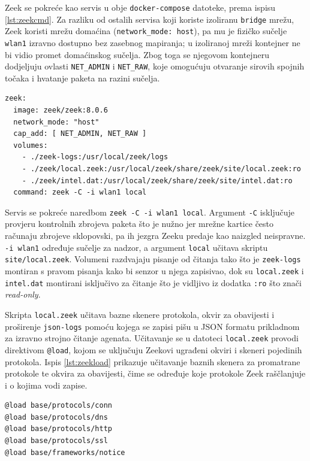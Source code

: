 Zeek se pokreće kao servis u obje \texttt{docker-compose} datoteke, prema ispisu \ref{lst:zeekcmd}. Za razliku od ostalih servisa koji koriste izoliranu
\texttt{bridge} mrežu, Zeek koristi mrežu domaćina (\texttt{network\_mode: host}), pa mu je fizičko sučelje \texttt{wlan1} izravno dostupno bez zasebnog mapiranja; u izoliranoj mreži kontejner
ne bi vidio promet domaćinskog sučelja. Zbog toga se njegovom kontejneru dodjeljuju ovlasti \texttt{NET\_ADMIN} i \texttt{NET\_RAW}, koje omogućuju otvaranje sirovih spojnih
točaka  i hvatanje paketa na razini sučelja.

\begin{lstlisting}[caption={Definicija senzora u \texttt{docker-compose.yml}}, label={lst:zeekcmd}]
zeek:
  image: zeek/zeek:8.0.6
  network_mode: "host"
  cap_add: [ NET_ADMIN, NET_RAW ]
  volumes:
    - ./zeek-logs:/usr/local/zeek/logs
    - ./zeek/local.zeek:/usr/local/zeek/share/zeek/site/local.zeek:ro
    - ./zeek/intel.dat:/usr/local/zeek/share/zeek/site/intel.dat:ro
  command: zeek -C -i wlan1 local
\end{lstlisting}

Servis se pokreće naredbom \texttt{zeek -C -i wlan1 local}. Argument \texttt{-C} isključuje provjeru kontrolnih zbrojeva  paketa što je nužno jer mrežne kartice često
računaju zbrojeve sklopovski, pa ih jezgra Zeeku predaje kao naizgled neispravne. \texttt{-i wlan1} određuje sučelje za nadzor, a argument \texttt{local} učitava skriptu
\texttt{site/local.zeek}. Volumeni razdvajaju pisanje od čitanja tako što je \texttt{zeek-logs} montiran s pravom pisanja kako bi senzor u njega zapisivao, dok su \texttt{local.zeek}
i \texttt{intel.dat} montirani isključivo za čitanje što je vidljivo iz dodatka \texttt{:ro} što znači \textit{read-only}.

Skripta \texttt{local.zeek} učitava bazne skenere protokola, okvir za obavijesti i proširenje \texttt{json-logs} pomoću kojega se zapisi pišu u JSON formatu prikladnom za izravno
strojno čitanje agenata. 
Učitavanje se u datoteci \texttt{local.zeek} provodi direktivom \texttt{@load}, kojom se uključuju Zeekovi ugrađeni okviri i skeneri pojedinih protokola. Ispis \ref{lst:zeekload} prikazuje učitavanje baznih skenera za promatrane protokole te okvira za obavijesti, čime se određuje koje protokole Zeek raščlanjuje i o kojima vodi zapise.

\begin{lstlisting}[caption={Učitavanje ugrađenih dodataka u \texttt{local.zeek}}, label={lst:zeekload}]
@load base/protocols/conn
@load base/protocols/dns
@load base/protocols/http
@load base/protocols/ssl
@load base/frameworks/notice
\end{lstlisting}

